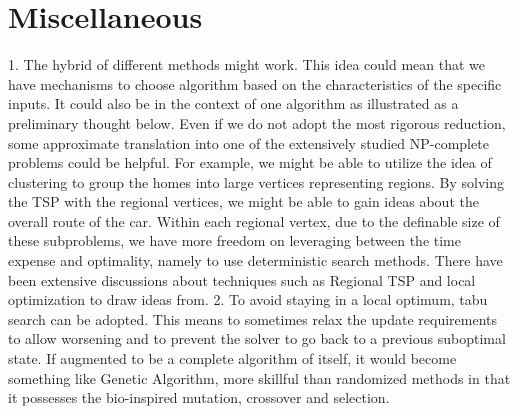 \documentclass{article}
\begin{document}
\section{Miscellaneous}
1. The hybrid of different methods might work. This idea could mean that we have mechanisms to choose algorithm based on the characteristics of the specific inputs. It could also be in the context of one algorithm as illustrated as a preliminary thought below. Even if we do not adopt the most rigorous reduction, some approximate translation into one of the extensively studied NP-complete problems could be helpful. For example, we might be able to utilize the idea of clustering to group the homes into large vertices representing regions. By solving the TSP with the regional vertices, we might be able to gain ideas about the overall route of the car. Within each regional vertex, due to the definable size of these subproblems, we have more freedom on leveraging between the time expense and optimality, namely to use deterministic search methods. There have been extensive discussions about techniques such as Regional TSP and local optimization to draw ideas from.
2. To avoid staying in a local optimum, tabu search can be adopted. This means to sometimes relax the update requirements to allow worsening and to prevent the solver to go back to a previous suboptimal state. If augmented to be a complete algorithm of itself, it would become something like Genetic Algorithm, more skillful than randomized methods in that it possesses the bio-inspired mutation, crossover and selection.
\end{document}
